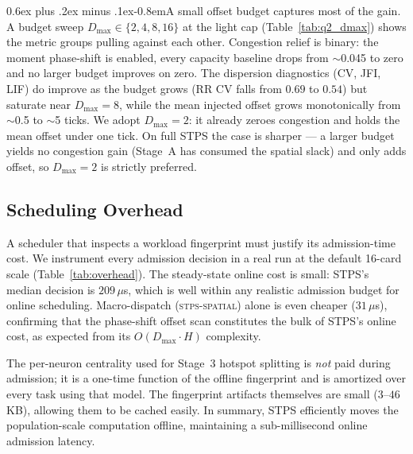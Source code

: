 \documentclass[letterpaper,twocolumn,10pt]{article}
\makeatletter
\newcommand{\tightparagraph}{\@startsection{paragraph}{4}{\z@}%
    {0.6ex plus .2ex minus .1ex}{-0.8em}{\normalfont\normalsize\bfseries}}
\makeatother
\begin{document}
\tightparagraph{A small offset budget captures most of the gain.} A budget sweep $D_{\max}\!\in\!\{2,4,8,16\}$ at the light cap (Table~\ref{tab:q2_dmax}) shows the metric groups pulling against each other. Congestion relief is binary: the moment phase-shift is enabled, every capacity baseline drops from $\sim$0.045 to zero and no larger budget improves on zero. The dispersion diagnostics (CV, JFI, LIF) do improve as the budget grows (RR CV falls from $0.69$ to $0.54$) but saturate near $D_{\max}\!=\!8$, while the mean injected offset grows monotonically from $\sim$0.5 to $\sim$5 ticks. We adopt $D_{\max}\!=\!2$: it already zeroes congestion and holds the mean offset under one tick. On full STPS the case is sharper --- a larger budget yields no congestion gain (Stage~A has consumed the spatial slack) and only adds offset, so $D_{\max}\!=\!2$ is strictly preferred.


\subsection{Scheduling Overhead}
\label{sec:eval:overhead}

A scheduler that inspects a workload fingerprint must justify its admission-time cost. We instrument every admission decision in a real run at the default 16-card scale (Table~\ref{tab:overhead}). The steady-state online cost is small: STPS's median decision is $209$\,$\mu$s, which is well within any realistic admission budget for online scheduling. Macro-dispatch (\textsc{stps-spatial}) alone is even cheaper ($31$\,$\mu$s), confirming that the phase-shift offset scan constitutes the bulk of STPS's online cost, as expected from its $O(D_{\max}\!\cdot\!H)$ complexity.

The per-neuron centrality used for Stage~3 hotspot splitting is \emph{not} paid during admission; it is a one-time function of the offline fingerprint and is amortized over every task using that model. The fingerprint artifacts themselves are small ($3$--$46$\,KB), allowing them to be cached easily. In summary, STPS efficiently moves the population-scale computation offline, maintaining a sub-millisecond online admission latency.
\end{document}
